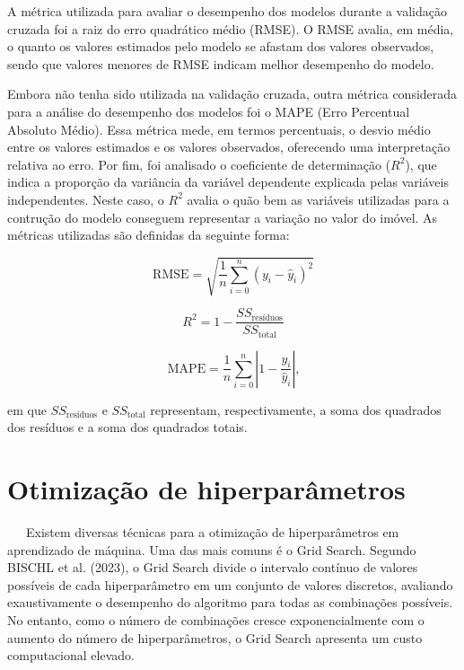 \documentclass[
  12pt,
  a4paper,
]{scrreprt}
\begin{document}
\vspace{12pt}

A métrica utilizada para avaliar o desempenho dos modelos durante a
validação cruzada foi a raiz do erro quadrático médio (RMSE). O RMSE
avalia, em média, o quanto os valores estimados pelo modelo se afastam
dos valores observados, sendo que valores menores de RMSE indicam melhor
desempenho do modelo.

\vspace{12pt}

Embora não tenha sido utilizada na validação cruzada, outra métrica
considerada para a análise do desempenho dos modelos foi o MAPE (Erro
Percentual Absoluto Médio). Essa métrica mede, em termos percentuais, o
desvio médio entre os valores estimados e os valores observados,
oferecendo uma interpretação relativa ao erro. Por fim, foi analisado o
coeficiente de determinação (\(R^2\)), que indica a proporção da
variância da variável dependente explicada pelas variáveis
independentes. Neste caso, o \(R^2\) avalia o quão bem as variáveis
utilizadas para a contrução do modelo conseguem representar a variação
no valor do imóvel. As métricas utilizadas são definidas da seguinte
forma:

\begin{figure}

\begin{minipage}{0.33\linewidth}
\[
\text{RMSE} = \sqrt{\dfrac{1}{n} \sum_{i = 0}^n (y_i - \hat y_i)^2}
\]\end{minipage}%
%
\begin{minipage}{0.33\linewidth}
\[
R^2 = 1 - \dfrac{SS_{\text{resíduos}}}{SS_{\text{total}}}
\]\end{minipage}%
%
\begin{minipage}{0.33\linewidth}
\[
\text{MAPE} = \frac{1}{n} \sum_{i=0}^n \left|1 - \frac{y_i}{\hat y_i}\right|\text{,}
\]\end{minipage}%

\end{figure}%

em que \(SS_{\text{resíduos}}\) e \(SS_{\text{total}}\) representam,
respectivamente, a soma dos quadrados dos resíduos e a soma dos
quadrados totais.

\section{Otimização de
hiperparâmetros}\label{otimizauxe7uxe3o-de-hiperparuxe2metros}

~~~Existem diversas técnicas para a otimização de hiperparâmetros em
aprendizado de máquina. Uma das mais comuns é o Grid Search. Segundo
BISCHL et al. (2023), o Grid Search divide o intervalo contínuo de
valores possíveis de cada hiperparâmetro em um conjunto de valores
discretos, avaliando exaustivamente o desempenho do algoritmo para todas
as combinações possíveis. No entanto, como o número de combinações
cresce exponencialmente com o aumento do número de hiperparâmetros, o
Grid Search apresenta um custo computacional elevado.
\end{document}
